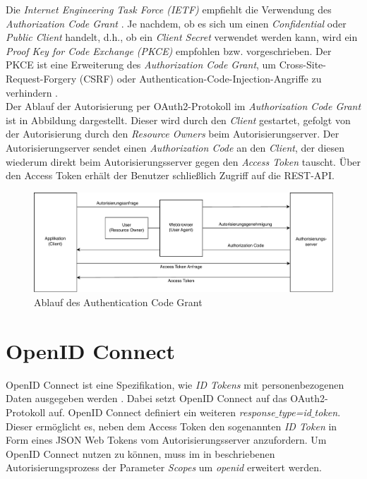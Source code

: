 Die \textit{Internet Engineering Task Force (IETF)} empfiehlt die Verwendung des \textit{Authorization Code Grant} \cite[Unterabschnitt~2.1.1]{ietf-oauth-security-topics-18}. 
Je nachdem, ob es sich um einen \textit{Confidential} oder \textit{Public Client} handelt, d.h., ob ein \textit{Client Secret} verwendet werden kann, wird ein \textit{Proof Key for Code Exchange (PKCE)} empfohlen bzw. vorgeschrieben. 
Der PKCE ist eine Erweiterung des \textit{Authorization Code Grant}, um Cross-Site-Request-Forgery (CSRF) oder Authentication-Code-Injection-Angriffe zu verhindern \cite{rfc7636}. \\

Der Ablauf der Autorisierung per OAuth2-Protokoll im \textit{Authorization Code Grant} ist in Abbildung  dargestellt. 
Dieser wird durch den \textit{Client} gestartet, gefolgt von der Autorisierung durch den \textit{Resource Owners} beim Autorisierungserver. 
Der Autorisierungserver sendet einen \textit{Authorization Code} an den \textit{Client}, der diesen wiederum direkt beim Autorisierungsserver gegen den \textit{Access Token} tauscht. Über den Access Token erhält der Benutzer schließlich Zugriff auf die REST-API.

\begin{figure}[htbp]
\centering
\includegraphics[width=\textwidth]{Authentication_Code_Grant.pdf}
\caption{Ablauf des Authentication Code Grant}
\label{fig:auth-code-grant}
\end{figure}

\section{OpenID Connect}
\label{auth:openid}

OpenID Connect ist eine Spezifikation, wie \textit{ID Tokens} mit personenbezogenen Daten ausgegeben werden \cite{OpenID.Core}. 
Dabei setzt OpenID Connect auf das OAuth2-Protokoll auf. 
OpenID Connect definiert ein weiteren \textit{response$\_$type=id$\_$token}. 
Dieser ermöglicht es, neben dem Access Token den sogenannten \textit{ID Token} in Form eines JSON Web Tokens \cite{rfc7519} vom Autorisierungsserver anzufordern. 
Um OpenID Connect nutzen zu können, muss im in  beschriebenen Autorisierungsprozess der Parameter \textit{Scopes} um \textit{openid} erweitert werden. \\

